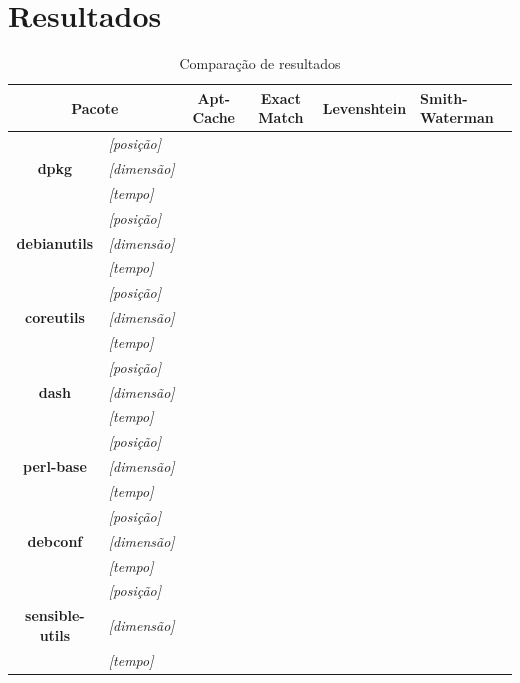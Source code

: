 \chapter{Resultados} %
\label{cha:resultados}

\begin{table}[htbp]
\caption{Comparação de resultados}
\begin{tabular}{|p{2cm}|l|c|c|c|p{2cm}|}
\hline
\multicolumn{ 2}{|c|}{\textbf{Pacote}} & \textbf{Apt-Cache} & \textbf{Exact Match} & \textbf{Levenshtein} & \textbf{Smith-Waterman} \\ \hline\hline
\multicolumn{ 1}{|c|}{} & \textit{[posição]} &  &  &  &  \\ \cline{ 2- 6}
\multicolumn{ 1}{|c|}{\textbf{dpkg}} & \textit{[dimensão]} &  &  &  &  \\ \cline{ 2- 6}
\multicolumn{ 1}{|c|}{} & \textit{[tempo]} &  &  &  &  \\ \hline
\multicolumn{ 1}{|c|}{} & \textit{[posição]} &  &  &  &  \\ \cline{ 2- 6}
\multicolumn{ 1}{|c|}{\textbf{debianutils}} & \textit{[dimensão]} &  &  &  &  \\ \cline{ 2- 6}
\multicolumn{ 1}{|c|}{} & \textit{[tempo]} &  &  &  &  \\ \hline
\multicolumn{ 1}{|c|}{} & \textit{[posição]} &  &  &  &  \\ \cline{ 2- 6}
\multicolumn{ 1}{|c|}{\textbf{coreutils}} & \textit{[dimensão]} &  &  &  &  \\ \cline{ 2- 6}
\multicolumn{ 1}{|c|}{} & \textit{[tempo]} &  &  &  &  \\ \hline
\multicolumn{ 1}{|c|}{} & \textit{[posição]} &  &  &  &  \\ \cline{ 2- 6}
\multicolumn{ 1}{|c|}{\textbf{dash}} & \textit{[dimensão]} &  &  &  &  \\ \cline{ 2- 6}
\multicolumn{ 1}{|c|}{} & \textit{[tempo]} &  &  &  &  \\ \hline
\multicolumn{ 1}{|c|}{} & \textit{[posição]} &  &  &  &  \\ \cline{ 2- 6}
\multicolumn{ 1}{|c|}{\textbf{perl-base}} & \textit{[dimensão]} &  &  &  &  \\ \cline{ 2- 6}
\multicolumn{ 1}{|c|}{} & \textit{[tempo]} &  &  &  &  \\ \hline
\multicolumn{ 1}{|c|}{} & \textit{[posição]} &  &  &  &  \\ \cline{ 2- 6}
\multicolumn{ 1}{|c|}{\textbf{debconf}} & \textit{[dimensão]} &  &  &  &  \\ \cline{ 2- 6}
\multicolumn{ 1}{|c|}{} & \textit{[tempo]} &  &  &  &  \\ \hline
\multicolumn{ 1}{|c|}{} & \textit{[posição]} &  &  &  &  \\ \cline{ 2- 6}
\multicolumn{ 1}{|c|}{\textbf{sensible-utils}} & \textit{[dimensão]} &  &  &  &  \\ \cline{ 2- 6}
\multicolumn{ 1}{|c|}{} & \textit{[tempo]} &  &  &  &  \\ \hline
\end{tabular}
\label{tab:comparacao}
\end{table}
